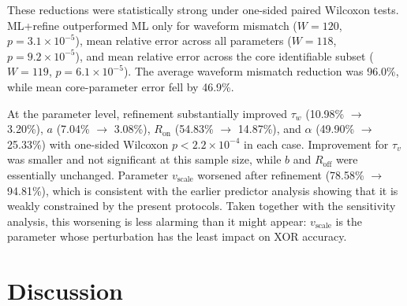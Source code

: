 \documentclass[letterpaper]{article}
\begin{document}
\begin{table}[t]
\centering
\caption{Rediscovery validation on 15 optimized specimens after excluding one numerical failure.}
\label{tab:rediscovery}
\small
\resizebox{\columnwidth}{!}{%
    
}
\end{table}


These reductions were statistically strong under one-sided paired Wilcoxon tests. ML+refine outperformed ML only for waveform mismatch ($W=120$, $p=3.1\times10^{-5}$), mean relative error across all parameters ($W=118$, $p=9.2\times10^{-5}$), and mean relative error across the core identifiable subset ($W=119$, $p=6.1\times10^{-5}$). The average waveform mismatch reduction was 96.0\%, while mean core-parameter error fell by 46.9\%.

At the parameter level, refinement substantially improved $\tau_w$ (10.98\% $\to$ 3.20\%), $a$ (7.04\% $\to$ 3.08\%), $R_{\mathrm{on}}$ (54.83\% $\to$ 14.87\%), and $\alpha$ (49.90\% $\to$ 25.33\%) with one-sided Wilcoxon $p<2.2\times10^{-4}$ in each case. Improvement for $\tau_v$ was smaller and not significant at this sample size, while $b$ and $R_{\mathrm{off}}$ were essentially unchanged. Parameter $v_{\text{scale}}$ worsened after refinement (78.58\% $\to$ 94.81\%), which is consistent with the earlier predictor analysis showing that it is weakly constrained by the present protocols. Taken together with the sensitivity analysis, this worsening is less alarming than it might appear: $v_{\text{scale}}$ is the parameter whose perturbation has the least impact on XOR accuracy.

\section{Discussion}
\end{document}
